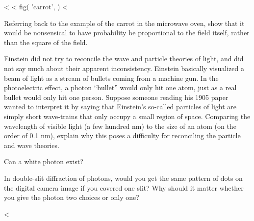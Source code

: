 <%
<%
  fig(
    'carrot',
  )
<%

\startdqs

\begin{dq}
Referring back to the example of the carrot in the
microwave oven, show that it would be nonsensical to have
probability be proportional to the field itself, rather than
the square of the field.
\end{dq}

\begin{dq}
Einstein did not try to reconcile the wave and particle
theories of light, and did not say much about their apparent
inconsistency. Einstein basically visualized a beam of light
as a stream of bullets coming from a machine gun. In the
photoelectric effect, a photon ``bullet'' would only hit one
atom, just as a real bullet would only hit one person.
Suppose someone reading his 1905 paper wanted to interpret
it by saying that Einstein's so-called particles of light
are simply short wave-trains that only occupy a small
region of space.  Comparing the wavelength of visible light
(a few hundred nm) to the size of an atom (on the order of
0.1 nm), explain why this poses a difficulty for reconciling
the particle and wave theories.
\end{dq}

\begin{dq}
Can a white photon exist?
\end{dq}

\begin{dq}\label{dq:cover-one-slit}
In double-slit diffraction of photons, would you get the
same pattern of dots on the digital camera image if you
covered one slit? Why should it matter whether you give the
photon two choices or only one?
\end{dq}

<%
